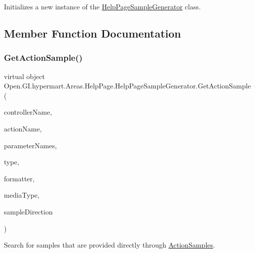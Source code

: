 Initializes a new instance of the \hyperlink{class_open_1_1_g_i_1_1hypermart_1_1_areas_1_1_help_page_1_1_help_page_sample_generator}{Help\+Page\+Sample\+Generator} class. 



\subsection{Member Function Documentation}
\hypertarget{class_open_1_1_g_i_1_1hypermart_1_1_areas_1_1_help_page_1_1_help_page_sample_generator_aafd6b28c8518482fe8d7826d4a36a2bf}{}\label{class_open_1_1_g_i_1_1hypermart_1_1_areas_1_1_help_page_1_1_help_page_sample_generator_aafd6b28c8518482fe8d7826d4a36a2bf} 
\subsubsection{\texorpdfstring{Get\+Action\+Sample()}{GetActionSample()}}
{\footnotesize\ttfamily virtual object Open.\+G\+I.\+hypermart.\+Areas.\+Help\+Page.\+Help\+Page\+Sample\+Generator.\+Get\+Action\+Sample (\begin{DoxyParamCaption}\item[{string}]{controller\+Name,  }\item[{string}]{action\+Name,  }\item[{I\+Enumerable$<$ string $>$}]{parameter\+Names,  }\item[{Type}]{type,  }\item[{Media\+Type\+Formatter}]{formatter,  }\item[{Media\+Type\+Header\+Value}]{media\+Type,  }\item[{\hyperlink{namespace_open_1_1_g_i_1_1hypermart_1_1_areas_1_1_help_page_a96790152101b7f9c7e4ff518bb45c822}{Sample\+Direction}}]{sample\+Direction }\end{DoxyParamCaption})\hspace{0.3cm}{\ttfamily [virtual]}}



Search for samples that are provided directly through \hyperlink{class_open_1_1_g_i_1_1hypermart_1_1_areas_1_1_help_page_1_1_help_page_sample_generator_a6e94135c5b0f1c91af7a2662aa40d713}{Action\+Samples}. 



